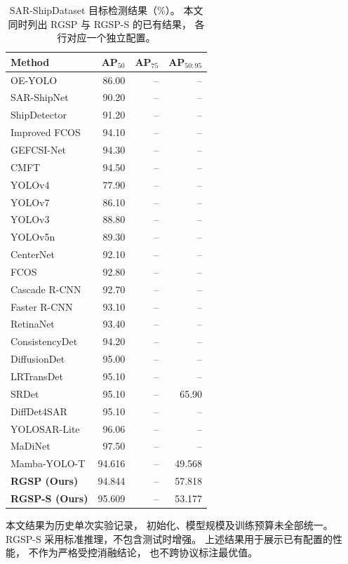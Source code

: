 \documentclass[journal]{IEEEtran}
\begin{document}
\begin{table}[!t]
\centering
\small
\setlength{\tabcolsep}{5pt}
\caption{SAR-ShipDataset 目标检测结果（\%）。
本文同时列出 RGSP 与 RGSP-S 的已有结果，
各行对应一个独立配置。}
\label{tab:sar_ship_comparison}
\begin{tabular*}{\textwidth}{@{\extracolsep{\fill}}lrrr}
\toprule
Method & AP$_{50}$ & AP$_{75}$ & AP$_{50:95}$ \\
\midrule
OE-YOLO           & 86.00 & -- & --    \\
SAR-ShipNet       & 90.20 & -- & --    \\
ShipDetector      & 91.20 & -- & --    \\
Improved FCOS     & 94.10 & -- & --    \\
GEFCSI-Net        & 94.30 & -- & --    \\
CMFT              & 94.50 & -- & --    \\
YOLOv4            & 77.90 & -- & --    \\
YOLOv7            & 86.10 & -- & --    \\
YOLOv3            & 88.80 & -- & --    \\
YOLOv5n           & 89.30 & -- & --    \\
CenterNet         & 92.10 & -- & --    \\
FCOS              & 92.80 & -- & --    \\
Cascade R-CNN     & 92.70 & -- & --    \\
Faster R-CNN      & 93.10 & -- & --    \\
RetinaNet         & 93.40 & -- & --    \\
ConsistencyDet    & 94.20 & -- & --    \\
DiffusionDet      & 95.00 & -- & --    \\
LRTransDet        & 95.10 & -- & --    \\
SRDet             & 95.10 & -- & 65.90 \\
DiffDet4SAR       & 95.10 & -- & --    \\
YOLOSAR-Lite      & 96.06 & -- & --    \\
MaDiNet           & 97.50 & -- & --    \\
\midrule
Mamba-YOLO-T      & 94.616 & -- & 49.568 \\
\textbf{RGSP (Ours)}
                  & 94.844 & -- & 57.818 \\
\textbf{RGSP-S (Ours)}
                  & 95.609 & -- & 53.177 \\
\bottomrule
\end{tabular*}

\smallskip
\begin{minipage}{\linewidth}
\footnotesize
本文结果为历史单次实验记录，
初始化、模型规模及训练预算未全部统一。
RGSP-S 采用标准推理，不包含测试时增强。
上述结果用于展示已有配置的性能，
不作为严格受控消融结论，
也不跨协议标注最优值。
\end{minipage}
\end{table}
\end{document}
